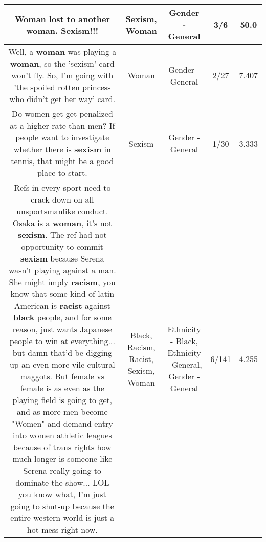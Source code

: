 \documentclass[11pt]{article}
\newlength\mylength
\begin{document}
\begin{center}
\begin{longtable}{|C{.65\mylength}|C{.30\mylength}|C{.12\mylength}|C{.12\mylength}|C{.12\mylength}|}
  \small Woman lost to another \textbf{woman}. \textbf{Sexism}!!!\normalsize   & Sexism, Woman & Gender - General & 3/6 & 50.0 \\  \hline
  \small Well, a \textbf{woman} was playing a \textbf{woman}, so the 'sexism' card won't fly. So, I'm going with 'the spoiled rotten princess who didn't get her way' card.\normalsize   & Woman & Gender - General & 2/27 & 7.407 \\  \hline
  \small Do women get get penalized at a higher rate than men? If people want to investigate whether there is \textbf{sexism} in tennis, that might be a good place to start.\normalsize   & Sexism & Gender - General & 1/30 & 3.333 \\  \hline
  \small Refs in every sport need to crack down on all unsportsmanlike conduct. Osaka is a \textbf{woman}, it's not \textbf{sexism}. The ref had not opportunity to commit \textbf{sexism} because Serena wasn't playing against a man. She might imply \textbf{racism}, you know that some kind of latin American is \textbf{racist} against \textbf{black} people, and for some reason, just wants Japanese people to win at everything... but damn that'd be digging up an even more vile cultural maggots. But female vs female is as even as the playing field is going to get, and as more men become "Women" and demand entry into women athletic leagues because of trans rights how much longer is someone like Serena really going to dominate the show... LOL you know what, I'm just going to shut-up because the entire western world is just a hot mess right now.\normalsize   & Black, Racism, Racist, Sexism, Woman & Ethnicity - Black, Ethnicity - General, Gender - General & 6/141 & 4.255 \\  \hline

\end{longtable}
\end{center}
\end{document}
